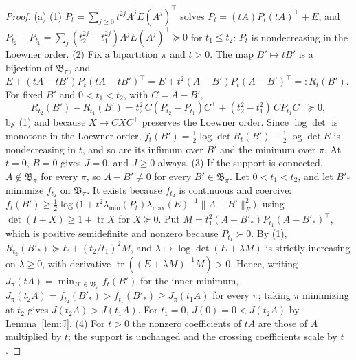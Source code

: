 \begin{proof}
(a) (1) $P_t=\sum_{j\ge0}t^{2j}A^jE(A^j)^\top$ solves $P_t=(tA)P_t(tA)^\top+E$, and $P_{t_2}-P_{t_1}=\sum_j(t_2^{2j}-t_1^{2j})A^jE(A^j)^\top\succeq0$ for $t_1\le t_2$: $P_t$ is nondecreasing in the Loewner order.
(2) Fix a bipartition $\pi$ and $t>0$. The map $B'\mapsto tB'$ is a bijection of $\mathfrak B_\pi$, and $E+(tA-tB')P_t(tA-tB')^\top=E+t^2(A-B')P_t(A-B')^\top=:R_t(B')$. For fixed $B'$ and $0<t_1<t_2$, with $C=A-B'$,
\begin{equation}\label{eq:resid-incr}
R_{t_2}(B')-R_{t_1}(B')=t_2^2\,C(P_{t_2}-P_{t_1})C^\top+(t_2^2-t_1^2)\,CP_{t_1}C^\top\succeq0,
\end{equation}
by (1) and because $X\mapsto CXC^\top$ preserves the Loewner order. Since $\log\det$ is monotone in the Loewner order, $f_t(B')=\tfrac12\log\det R_t(B')-\tfrac12\log\det E$ is nondecreasing in $t$, and so are its infimum over $B'$ and the minimum over $\pi$. At $t=0$, $B=0$ gives $J=0$, and $J\ge0$ always.
(3) If the support is connected, $A\notin\mathfrak B_\pi$ for every $\pi$, so $A-B'\ne0$ for every $B'\in\mathfrak B_\pi$. Let $0<t_1<t_2$, and let $B'_*$ minimize $f_{t_2}$ on $\mathfrak B_\pi$. It exists because $f_{t_2}$ is continuous and coercive: $f_t(B')\ge\tfrac12\log\bigl(1+t^2\lambda_{\min}(P_t)\lambda_{\max}(E)^{-1}\lVert A-B'\rVert_F^2\bigr)$, using $\det(I+X)\ge1+\operatorname{tr}X$ for $X\succeq0$. Put $M=t_1^2(A-B'_*)P_{t_1}(A-B'_*)^\top$, which is positive semidefinite and nonzero because $P_{t_1}\succ0$. By (1), $R_{t_2}(B'_*)\succeq E+(t_2/t_1)^2M$, and $\lambda\mapsto\log\det(E+\lambda M)$ is strictly increasing on $\lambda\ge0$, with derivative $\operatorname{tr}((E+\lambda M)^{-1}M)>0$. Hence, writing $J_\pi(tA)=\min_{B'\in\mathfrak B_\pi}f_t(B')$ for the inner minimum, $J_\pi(t_2A)=f_{t_2}(B'_*)>f_{t_1}(B'_*)\ge J_\pi(t_1A)$ for every $\pi$; taking $\pi$ minimizing at $t_2$ gives $J(t_2A)>J(t_1A)$. For $t_1=0$, $J(0)=0<J(t_2A)$ by Lemma~\ref{lem:J}.
(4) For $t>0$ the nonzero coefficients of $tA$ are those of $A$ multiplied by $t$; the support is unchanged and the crossing coefficients scale by $t$.


\end{proof}
